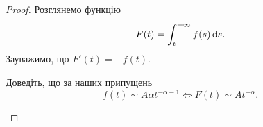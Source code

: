 \begin{proof}
    Розглянемо функцію 
    \begin{equation}
        F(t) = \int_t^{+\infty} f(s) \mathop{}\!\mathrm{d} s.
    \end{equation}
    Зауважимо, що $F'(t) = -f(t)$.

    \begin{exercise}
        Доведіть, що за наших припущень
        \begin{equation}
            f(t) \sim A \alpha t^{-\alpha - 1} \iff F(t) \sim A t^{-\alpha}.
        \end{equation}
    \end{exercise}
            
            

\end{proof}
